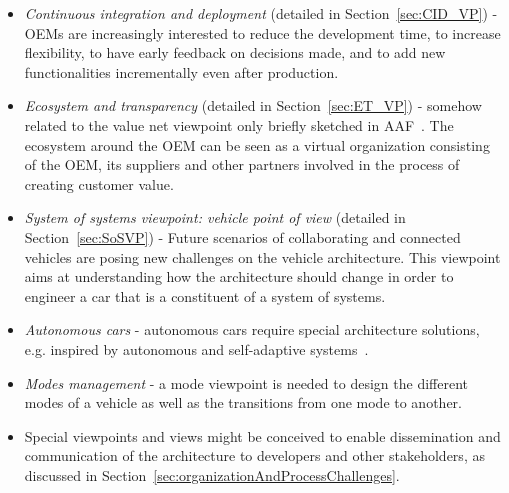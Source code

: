 	\begin{itemize}
	\item \emph{Continuous integration and deployment} (detailed in Section~\ref{sec:CID_VP}) - OEMs are increasingly interested to reduce the development time, to increase flexibility, to have early feedback on decisions made, and to add new functionalities incrementally even after production. %
		\item \emph{Ecosystem and transparency} (detailed in Section~\ref{sec:ET_VP}) - somehow related to the value net viewpoint only briefly sketched in AAF~\cite{TUM-I0915,Broy}. %
		The ecosystem around the OEM can be seen as a virtual %
	organization consisting of the OEM, its suppliers and other partners %
	involved in the process of creating customer value.
	\item \emph{System of systems viewpoint: vehicle point of view} (detailed in Section~\ref{sec:SoSVP}) - Future scenarios of collaborating and connected vehicles are posing new challenges on the vehicle architecture. This viewpoint aims at understanding how the architecture should change in order to engineer a car that is a constituent of a system of systems.
	\item \emph{Autonomous cars} - autonomous cars require special architecture solutions, e.g. inspired by autonomous and self-adaptive systems~\cite{Salehie2009}.
	\item \emph{Modes management} - a mode viewpoint is needed to design the different modes of a vehicle as well as the transitions from one mode to another.
	\item Special viewpoints and views might be conceived to enable dissemination and communication of the architecture to developers and other stakeholders, as discussed in Section~\ref{sec:organizationAndProcessChallenges}.
	\end{itemize}


